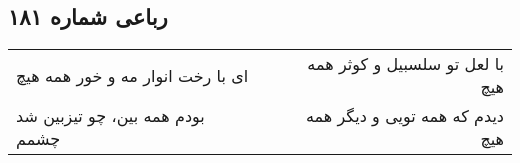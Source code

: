 \begin{center}
\section*{رباعی شماره ۱۸۱}
\label{sec:sh181}
\begin{longtable}{l p{0.5cm} r}
ای با رخت انوار مه و خور همه هیچ
&&
با لعل تو سلسبیل و کوثر همه هیچ
\\
بودم همه بین، چو تیزبین شد چشمم
&&
دیدم که همه تویی و دیگر همه هیچ
\\
\end{longtable}
\end{center}
